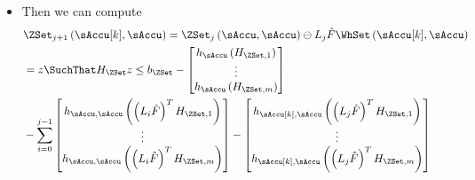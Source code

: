 \begin{itemize}
\item Then we can compute
{\footnotesize
\begin{equation}
\begin{split}
&\ZSet_{j+1}\left(\sAccu[k],\sAccu\right) =\ZSet_{j}\left(\sAccu,\sAccu\right)\ominus L_{j}\hat{F}\WhSet\left(\sAccu[k],\sAccu\right)\\
&= z\SuchThat H_{\ZSet}z\leq b_{\ZSet}-\begin{bmatrix}h_{\sAccu}\left(H_{\ZSet,1}\right)\\
\vdots\\
h_{\sAccu}\left(H_{\ZSet,m}\right)
\end{bmatrix} \\
&-\sum_{i=0}^{j-1}\begin{bmatrix}h_{\sAccu,\sAccu}\left(\left(L_{i}\hat{F}\right)^{T}H_{\ZSet,1}\right)\\
\vdots\\
h_{\sAccu,\sAccu}\left(\left(L_{i}\hat{F}\right)^{T}H_{\ZSet,m}\right)
\end{bmatrix}-\begin{bmatrix}h_{\sAccu[k],\sAccu}\left(\left(L_{j}\hat{F}\right)^{T}H_{\ZSet,1}\right)\\
\vdots\\
h_{\sAccu[k],\sAccu}\left(\left(L_{j}\hat{F}\right)^{T}H_{\ZSet,m}\right)
\end{bmatrix}%
\end{split}
\end{equation}
}
\end{itemize}


